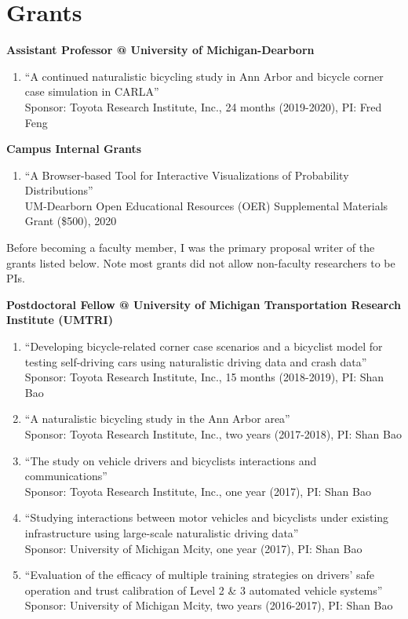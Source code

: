 \documentclass[11pt]{article}
\newenvironment{main}
{\begin{adjustwidth}{3em}{}}
{\end{adjustwidth}}
\begin{document}
\section*{Grants}
\begin{main}

\textbf{Assistant Professor @ University of Michigan-Dearborn}

\begin{enumerate}
\item “A continued naturalistic bicycling study in Ann Arbor and bicycle corner case simulation in CARLA” \\
    Sponsor: Toyota Research Institute, Inc., 24 months (2019-2020), PI: Fred Feng
\end{enumerate}

\textbf{Campus Internal Grants}
\begin{enumerate}
\item “A Browser-based Tool for Interactive Visualizations of Probability Distributions” \\
    UM-Dearborn Open Educational Resources (OER) Supplemental Materials Grant (\$500), 2020
\end{enumerate}

Before becoming a faculty member, I was the primary proposal writer of the grants listed below. Note most grants did not allow non-faculty researchers to be PIs.

\textbf{Postdoctoral Fellow @ University of Michigan Transportation Research Institute (UMTRI)}

\begin{enumerate}
    \item “Developing bicycle-related corner case scenarios and a bicyclist model for testing self-driving cars using naturalistic driving data and crash data” \\
        Sponsor: Toyota Research Institute, Inc., 15 months (2018-2019), PI: Shan Bao
    \item “A naturalistic bicycling study in the Ann Arbor area” \\
        Sponsor: Toyota Research Institute, Inc., two years (2017-2018), PI: Shan Bao
    \item “The study on vehicle drivers and bicyclists interactions and communications” \\
        Sponsor: Toyota Research Institute, Inc., one year (2017), PI: Shan Bao
    \item “Studying interactions between motor vehicles and bicyclists under existing infrastructure using large-scale naturalistic driving data” \\
        Sponsor: University of Michigan Mcity, one year (2017), PI: Shan Bao
    \item “Evaluation of the efficacy of multiple training strategies on drivers’ safe operation and trust calibration of Level 2 \& 3 automated vehicle systems” \\
        Sponsor: University of Michigan Mcity, two years (2016-2017), PI: Shan Bao
\end{enumerate}


\end{main}
\end{document}
